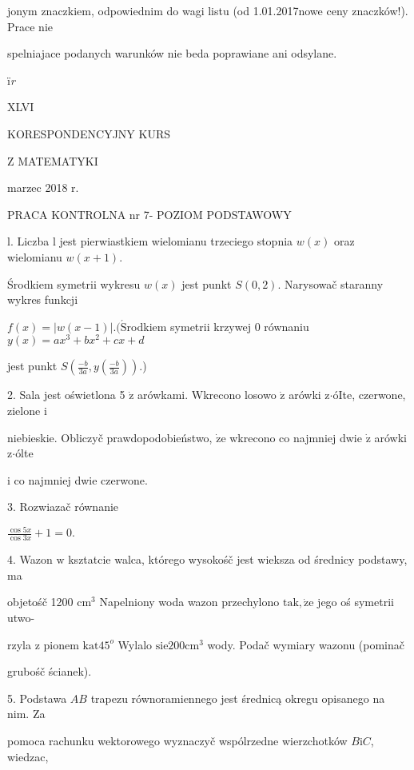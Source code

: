 \documentclass[a4paper,12pt]{article}
\begin{document}
jonym znaczkiem, odpowiednim do wagi listu (od 1.01.2017nowe ceny znaczków!). Prace nie

spelniajace podanych warunków nie beda poprawiane ani odsylane.

ï{\it r}







XLVI

KORESPONDENCYJNY KURS

Z MATEMATYKI

marzec 2018 r.

PRACA KONTROLNA nr 7- POZIOM PODSTAWOWY

l. Liczba l jest pierwiastkiem wielomianu trzeciego stopnia $w(x)$ oraz wielomianu $w(x+1).$

Środkiem symetrii wykresu $w(x)$ jest punkt $S(0,2)$. Narysowač staranny wykres funkcji

$f(x)= |w(x-1)|. (\acute{\mathrm{S}}$rodkiem symetrii krzywej $0$ równaniu $y(x) =ax^{3}+bx^{2}+cx+d$

jest punkt $S(\displaystyle \frac{-b}{3a},y(\frac{-b}{3a})).$)

2. Sala jest oświetlona 5 $\dot{\mathrm{z}}$ arówkami. Wkrecono losowo $\dot{\mathrm{z}}$ arówki z$\cdot$óIte, czerwone, zielone $\mathrm{i}$

niebieskie. Obliczyč prawdopodobieństwo, $\dot{\mathrm{z}}\mathrm{e}$ wkrecono co najmniej dwie $\dot{\mathrm{z}}$ arówki z$\cdot$ólte

$\mathrm{i}$ co najmniej dwie czerwone.

3. Rozwiazač równanie

$\displaystyle \frac{\cos 5x}{\cos 3x}+1=0.$

4. Wazon $\mathrm{w}$ ksztatcie walca, którego wysokośč jest wieksza od średnicy podstawy, ma

objetośč 1200 $\mathrm{c}\mathrm{m}^{3}$ Napelniony woda wazon przechylono $\mathrm{t}\mathrm{a}\mathrm{k}, \dot{\mathrm{z}}\mathrm{e}$ jego oś symetrii utwo-

rzyla $\mathrm{z}$ pionem $\mathrm{k}\mathrm{a}\mathrm{t}45^{o}$ Wylalo $\mathrm{s}\mathrm{i}\mathrm{e}200\mathrm{c}\mathrm{m}^{3}$ wody. Podač wymiary wazonu (pominač

grubośč ścianek).

5. Podstawa $AB$ trapezu równoramiennego jest średnicą okregu opisanego na nim. Za

pomoca rachunku wektorowego wyznaczyč wspólrzedne wierzchotków $B\mathrm{i}C$, wiedzac,
\end{document}
